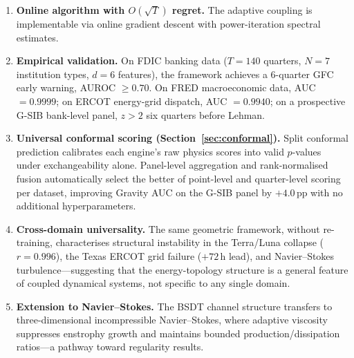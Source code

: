 \documentclass[final]{siamltex}
\begin{document}
\begin{enumerate}
\item \textbf{Online algorithm with $O(\sqrt{T})$ regret.} The
  adaptive coupling is implementable via online gradient descent
  with power-iteration spectral estimates.

\item \textbf{Empirical validation.} On FDIC banking data
  ($T=140$ quarters, $N=7$ institution types, $d=6$ features), the
  framework achieves a 6-quarter GFC early warning, AUROC $\ge
  0.70$.  On FRED macroeconomic data, AUC $= 0.9999$; on ERCOT
  energy-grid dispatch, AUC $= 0.9940$; on a prospective G-SIB
  bank-level panel, $z > 2$ six quarters before Lehman.

\item \textbf{Universal conformal scoring
  (Section~\ref{sec:conformal}).}  Split conformal prediction
  calibrates each engine's raw physics scores into valid
  $p$-values under exchangeability alone.  Panel-level
  aggregation and rank-normalised fusion automatically select
  the better of point-level and quarter-level scoring per
  dataset, improving Gravity AUC on the G-SIB panel by
  $+4.0$\,pp with no additional hyperparameters.

\item \textbf{Cross-domain universality.} The same geometric
  framework, without re-training, characterises structural
  instability in the Terra/Luna collapse ($r=0.996$),
  the Texas ERCOT grid failure ($+72$\,h lead), and
  Navier--Stokes turbulence---suggesting that the energy-topology
  structure is a general feature of coupled dynamical systems,
  not specific to any single domain.

\item \textbf{Extension to Navier--Stokes.} The BSDT channel
  structure transfers to three-dimensional incompressible
  Navier--Stokes, where adaptive viscosity suppresses enstrophy
  growth and maintains bounded production/dissipation ratios---a
  pathway toward regularity results.
\end{enumerate}
\end{document}
